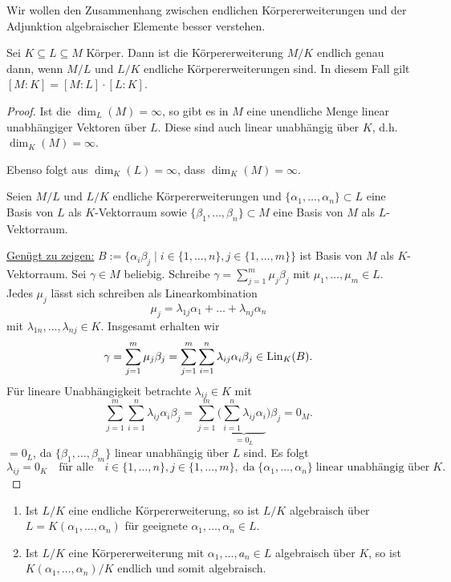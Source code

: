 \begin{leftbar}
	{Wir wollen den Zusammenhang zwischen endlichen Körpererweiterungen und der Adjunktion algebraischer Elemente besser verstehen.}
\end{leftbar}
\begin{satz}[Gradformel]\label{satz7_16}
	Sei $K \subseteq L \subseteq M$ Körper. Dann ist die Körpererweiterung $M/K$ endlich genau dann, wenn $M/L$ und $L/K$ endliche Körpererweiterungen sind. In diesem Fall gilt $[M:K] = [M:L] \cdot [L:K]$.
\end{satz}
\begin{proof}
	Ist die $\dim_L(M) = \infty$, so gibt es in $M$ eine unendliche Menge linear unabhängiger Vektoren über $L$. Diese sind auch linear unabhängig über $K$, d.h. $\dim_K(M) = \infty$.
	
	Ebenso folgt aus $\dim_K(L) = \infty$, dass $\dim_K(M) = \infty$.
	
	Seien $M/L$ und $L/K$ endliche Körpererweiterungen und $\{\alpha_1, \dots, \alpha_n\} \subset L$ eine Basis von $L$ als $K$-Vektorraum sowie $\{\beta_1, \dots, \beta_n\} \subset M$ eine Basis von $M$ als $L$-Vektorraum. 
	
	\underline{Genügt zu zeigen:} $B := \{\alpha_i \beta_j \mid i \in \{1, \dots, n\}, j \in \{1, \dots, m\}\}$ ist Basis von $M$ als $K$-Vektorraum. Sei $\gamma \in M$ beliebig. Schreibe $\gamma = \sum_{j=1}^m \mu_j \beta_j$ mit $\mu_1, \dots, \mu_m \in L$. Jedes $\mu_j$ lässt sich schreiben als Linearkombination
	\[\mu_j = \lambda_{1j} \alpha_1 + \dots + \lambda_{nj} \alpha_n\]
	mit $\lambda_{1n}, \dots, \lambda_{nj} \in K$. Insgesamt erhalten wir 
	\[\gamma = \sum_{j=1}^m \mu_j \beta_j = \sum_{j=1}^m \sum_{i=1}^n \lambda_{ij} \alpha_i \beta_j \in \operatorname{Lin}_K(B).\]
	Für lineare Unabhängigkeit  betrachte $\lambda_{ij} \in K$ mit 
	\[\sum_{j=1}^m \sum_{i=1}^n \lambda_{ij} \alpha_i \beta_j = \sum_{j=1}^m \bigg(\underbrace{\sum_{i=1}^n \lambda_{ij} \alpha_i}_{=0_L} \bigg)\beta_j = 0_M.\]
	$=0_L$, da $\{\beta_1, \dots, \beta_m\}$ linear unabhängig über $L$ sind. Es folgt
	\[\lambda_{ij} = 0_K \quad\text{für alle}\quad i \in \{1, \dots, n\}, j \in \{1, \dots, m\},\;\text{da}\;\{\alpha_1,\dots, \alpha_n\} \;\text{linear unabhängig über}\; K.\]
\end{proof}
\begin{kor}\label{kor7_17}
	\begin{enumerate}[label=(\alph*)]
		\item Ist $L/K$ eine endliche Körpererweiterung, so ist $L/K$ algebraisch über $L = K(\alpha_1, \dots, \alpha_n)$ für geeignete $\alpha_1, \dots, \alpha_n \in L$.
		\item Ist $L/K$ eine Körpererweiterung mit $\alpha_1, \dots, a_n \in L$ algebraisch über $K$, so ist $K(\alpha_1, \dots, \alpha_n)/K$ endlich und somit algebraisch.
	\end{enumerate}
\end{kor}
